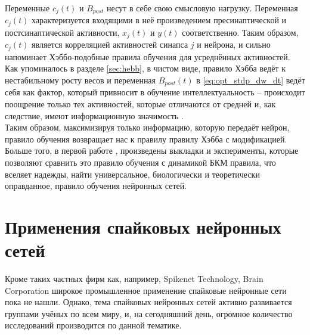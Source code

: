 \documentclass[a4paper,10pt]{article}
\begin{document}
\indent Переменные $c_{j}(t)$ и $B_{post}$ несут в себе свою смысловую нагрузку. Переменная $c_{j}(t)$ характеризуется входящими в неё произведением пресинаптической и постсинаптической активности, $x_{j}(t)$ и $y(t)$ соответственно. Таким образом, $c_{j}(t)$ является корреляцией активностей синапса $j$ и нейрона, и сильно напоминает Хэббо-подобные правила обучения для усреднённых активностей. Как упоминалось в разделе \ref{sec:hebb}, в чистом виде, правило Хэбба ведёт к нестабильному росту весов и переменная $B_{post}(t)$ в \eqref{eq:opt_stdp_dw_dt} ведёт себя как фактор, который привносит в обучение интеллектуальность -- происходит поощрение только тех активностей, которые отличаются от средней и, как следствие, имеют информационную значимость \cite{OptStdpFirst}.\\
\indent Таким образом, максимизируя только информацию, которую передаёт нейрон, правило обучения возвращает нас к правилу правилу Хэбба с модификацией. Больше того, в первой работе \cite{OptStdpFirst}, произведены выкладки и эксперименты, которые позволяют сравнить это правило обучения с динамикой БКМ правила, что вселяет надежды, найти универсальное, биологически и теоретически оправданное, правило обучения нейронных сетей.

\section{Применения спайковых нейронных сетей}
\indent Кроме таких частных фирм как, например, Spikenet Technology, Brain Corporation широкое промышленное применение спайковые нейронные сети пока не нашли. Однако, тема спайковых нейронных сетей активно развивается группами учёных по всем миру, и, на сегодняшний день, огромное количество исследований производится по данной тематике.
\end{document}
